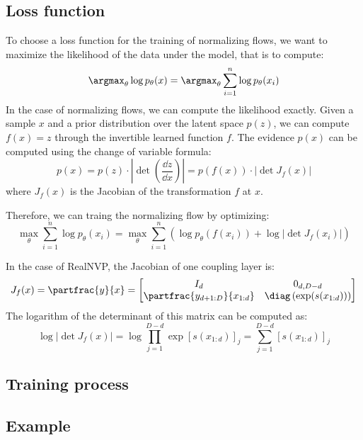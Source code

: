\subsection{Loss function}
To choose a loss function for the training of normalizing flows, we want to maximize the likelihood of the data under the model, that is to compute:
\begin{equation*}
    \argmax_{\theta} \log p_\theta(x) = \argmax_{\theta} \sum_{i=1}^n \log p_\theta(x_i)
\end{equation*}
In the case of normalizing flows, we can compute the likelihood exactly. Given a sample $x$ and a prior distribution over the latent space $p(z)$, we can compute $f(x)=z$ through the invertible learned function $f$. The evidence $p(x)$ can be computed using the change of variable formula:
\begin{equation*}
    p(x) = p(z)\cdot\left|\det\left(\frac{\dd z}{\dd x}\right)\right| = p(f(x))\cdot\left|\det J_f(x)\right|
\end{equation*}
where $J_f(x)$ is the Jacobian of the transformation $f$ at $x$. 

Therefore, we can traing the normalizing flow by optimizing:
\begin{equation*}
    \max_\theta\sum_{i=1}^n \log p_\theta(x_i) = \max_\theta\sum_{i=1}^n \left(\log p_\theta(f(x_i)) + \log\left|\det J_f(x_i)\right|\right)
\end{equation*}

In the case of RealNVP, the Jacobian of one coupling layer is:
\begin{equation*}
    J_f(x) = \partfrac{y}{x} = \begin{bmatrix}
        I_d & 0_{d, D-d}\\
        \partfrac{y_{d+1:D}}{x_{1:d}} & \diag\left(\exp(s(x_{1:d}))\right)
    \end{bmatrix}
\end{equation*}
The logarithm of the determinant of this matrix can be computed as:
\begin{equation*}
    \log\left|\det J_f(x)\right| = \log\prod_{j=1}^{D-d}\exp\left[s(x_{1:d})\right]_j = \sum_{j=1}^{D-d} \left[s(x_{1:d})\right]_j
\end{equation*}

\subsection{Training process}

\subsection{Example}

